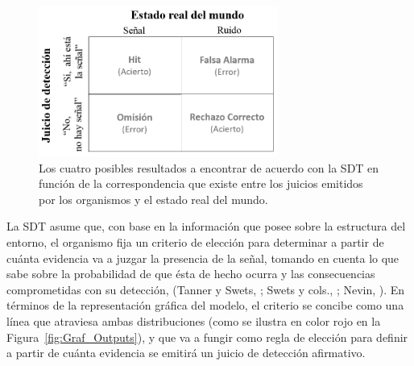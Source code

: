 \begin{figure}[th]
\centering
\includegraphics[width=0.70\textwidth]{Figures/Matriz_Outputs} 
\caption[Matriz de contingencia con los posibles Resultados en una Tarea de Detección]{Los cuatro posibles resultados a encontrar de acuerdo con la SDT en función de la correspondencia que existe entre los juicios emitidos por los organismos y el estado real del mundo.}
\label{fig:Mat_Output}
\end{figure}

La SDT asume que, con base en la información que posee sobre la estructura del entorno, el organismo fija un criterio de elección para determinar a partir de cuánta evidencia va a juzgar la presencia de la señal, tomando en cuenta lo que sabe sobre la probabilidad de que ésta de hecho ocurra y las consecuencias comprometidas con su detección, (Tanner y Swets, \citeyear{Tanner1954}; Swets y cols., \citeyear{Swets1961}; Nevin, \citeyear{Nevin1969}). En términos de la representación gráfica del modelo, el criterio se concibe como una línea que atraviesa ambas distribuciones (como se ilustra en color rojo en la Figura~\ref{fig:Graf_Outputs}), y que va a fungir como regla de elección para definir a partir de cuánta evidencia se emitirá un juicio de detección afirmativo.\\


